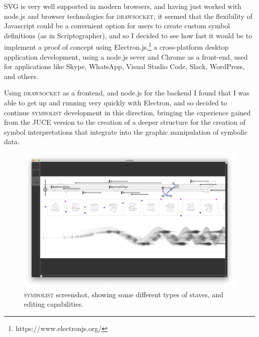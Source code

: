 \documentclass{article}
\def\symbolist{\textsc{symbolist}\xspace}
\def\drawsocket{\textsc{drawsocket}\xspace}
\begin{document}
SVG is very well supported in modern browsers, and having just worked with node.js and browser technologies for \drawsocket, it seemed that the flexibility of Javascript could be a convenient option for users to create custom symbol definitions (as in Scriptographer), and so I decided to see how fast it would be to implement a proof of concept using Electron.js,\footnote{https://www.electronjs.org/} a cross-platform desktop application development, using a node.js sever and Chrome as a front-end, used for applications like Skype, WhatsApp, Visual Studio Code, Slack, WordPress, and others.

Using \drawsocket as a frontend, and node.js for the backend I found that I was able to get up and running very quickly with Electron, and so decided to continue \symbolist development in this direction, bringing the experience gained from the JUCE version to the creation of a deeper structure for the creation of symbol interpretations that integrate into the graphic manipulation of symbolic data. 

\begin{figure}[ht!]
\centering
\includegraphics[width=2\columnwidth]{symbolist.png}
\caption{ \symbolist screenshot, showing some different types of staves, and editing capabilities.
\label{fig:screenshot}}
\end{figure}


%
\end{document}
